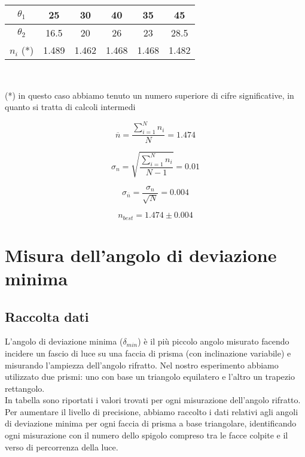 \begin{center}
\begin{tabular}{c|c|c|c|c|c}
\textbf{$\theta_1$} & 25 & 30 & 40 & 35 & 45\\
\midrule
\textbf{$\theta_2$} & 16.5 & 20 & 26 & 23 & 28.5\\
\midrule
\textbf{$n_i$} (*) & 1.489 & 1.462 & 1.468 & 1.468 & 1.482\\
\end{tabular}\\

\end{center}
(*) in questo caso abbiamo tenuto un numero superiore di cifre significative, in quanto si tratta di calcoli intermedi 

$$\overline{n} = \frac{\displaystyle\sum\limits_{i=1}^N n_i}{N} = 1.474 $$

$$\sigma_n = \sqrt{\frac{\sum_{i=1}^N n_i}{N-1}} = 0.01$$

$$\sigma_{\overline{n}} = \frac{\sigma_n}{\sqrt{N}} = 0.004$$

$$n_{best} = 1.474  \pm 0.004 $$


\section{Misura dell'angolo di deviazione minima}
\subsection{Raccolta dati}

L'angolo di deviazione minima ($\delta_{min}$) è il più piccolo angolo misurato facendo incidere un fascio di luce su una faccia di prisma (con inclinazione variabile) e misurando l'ampiezza dell'angolo rifratto. Nel nostro esperimento abbiamo utilizzato due prismi: uno con base un triangolo equilatero e l'altro un trapezio rettangolo.
\\

In tabella sono riportati i valori trovati per ogni misurazione dell'angolo rifratto. Per aumentare il livello di precisione, abbiamo raccolto i dati relativi agli angoli di deviazione minima per ogni faccia di prisma a base triangolare, identificando ogni misurazione con il numero dello spigolo compreso tra le facce colpite e il verso di percorrenza della luce.
\\


